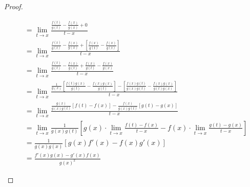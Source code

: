 \documentclass{article}
\theoremstyle{definition}
\begin{document}
\begin{proof}
\begin{enumerate}
\begin{align*}
				&=\lim\limits_{t\to x}\frac{\frac{f(t)}{g(t)}-\frac{f(x)}{g(x)}+0}{t-x}\\
				&=\lim\limits_{t\to x}\frac{\frac{f(t)}{g(t)}-\frac{f(x)}{g(x)}+\left[\frac{f(x)}{g(t)}-\frac{f(x)}{g(t)}\right]}{t-x}\\&=\lim\limits_{t\to x}\frac{\frac{f(t)}{g(t)}-\frac{f(x)}{g(t)}+\frac{f(x)}{g(t)}-\frac{f(x)}{g(x)}}{t-x}\\
				&=\lim\limits_{t\to x}\frac{\frac{1}{g(x)}\left[\frac{f(t)g(x)}{g(t)}-\frac{f(x)g(x)}{g(t)}\right]-\left[\frac{f(x)g(t)}{g(x)g(t)}-\frac{f(x)g(x)}{g(t)g(x)}\right]}{t-x}\\	&=\lim\limits_{t\to x}\frac{\frac{g(x)}{g(x)g(t)}\left[f(t)-f(x)\right]-\frac{f(x)}{g(x)g(t)}\left[g(t)-g(x)\right]}{t-x}\\
				&=\lim\limits_{t\to x}\frac{1}{g(x)g(t)}\left[g(x)\cdot\lim\limits_{t\to x}\frac{f(t)-f(x)}{t-x}-f(x)\cdot\lim\limits_{t\to x}\frac{g(t)-g(x)}{t-x}\right]\\&=\frac{1}{g(x)g(x)}[g(x)f'(x)-f(x)g'(x)]\\&=\frac{f'(x)g(x)-g'(x)f(x)}{g(x)^2}
			\end{align*}
			
		\end{enumerate}
	\end{proof}
	
\end{document}
